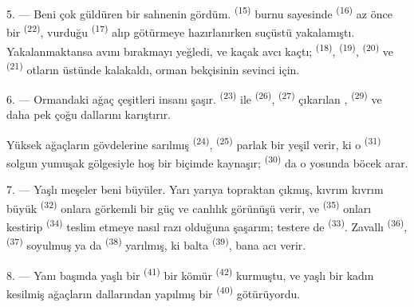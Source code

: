 5. --- Beni çok güldüren bir sahnenin  gördüm.
 \textsuperscript{(15)} burnu sayesinde  \textsuperscript{(16)} az önce bir 
\textsuperscript{(22)}, vurduğu  \textsuperscript{(17)} alıp
götürmeye hazırlanırken suçüstü yakalamıştı. Yakalanmaktansa avını bırakmayı
yeğledi, ve kaçak avcı kaçtı;  \textsuperscript{(18)},
 \textsuperscript{(19)},  \textsuperscript{(20)}
ve  \textsuperscript{(21)} otların üstünde kalakaldı,
orman bekçisinin sevinci için.

6. --- Ormandaki ağaç çeşitleri insanı şaşır. 
\textsuperscript{(23)} ile  \textsuperscript{(26)},
 \textsuperscript{(27)} çıkarılan ,
 \textsuperscript{(29)} ve daha pek çoğu dallarını karıştırır.

Yüksek ağaçların gövdelerine sarılmış 
\textsuperscript{(24)},  \textsuperscript{(25)} parlak
bir yeşil verir, ki o  \textsuperscript{(31)} solgun yumuşak
gölgesiyle hoş bir biçimde kaynaşır; 
\textsuperscript{(30)} da o yosunda böcek arar.

\VUsaut{3.0mm}
\VUsaut{3.0mm}

7. --- Yaşlı meşeler beni büyüler. Yarı yarıya topraktan çıkmış, kıvrım kıvrım
büyük  \textsuperscript{(32)} onlara görkemli bir güç ve
canlılık görünüşü verir, ve  \textsuperscript{(35)} onları
kestirip   \textsuperscript{(34)}
teslim etmeye nasıl razı olduğuna şaşarım; testere de 
\textsuperscript{(33)}. Zavallı  \textsuperscript{(36)},
 \textsuperscript{(37)} soyulmuş ya da
 \textsuperscript{(38)} yarılmış, ki balta
 \textsuperscript{(39)}, bana acı verir.

8. --- Yanı başında yaşlı bir  \textsuperscript{(41)}
 bir kömür  \textsuperscript{(42)} kurmuştu,
ve yaşlı bir kadın kesilmiş ağaçların dallarından yapılmış bir
  \textsuperscript{(40)} götürüyordu.

\VUsaut{3.0mm}
\VUsaut{3.0mm}

